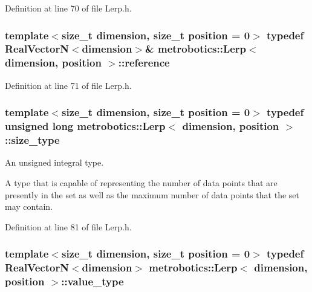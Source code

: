 \-Definition at line 70 of file \-Lerp.\-h.

\hypertarget{classmetrobotics_1_1Lerp_ae64c70e9dc4c0c99af76b155f6786ec0}{
\subsubsection[{reference}]{\setlength{\rightskip}{0pt plus 5cm}template$<$size\-\_\-t dimension, size\-\_\-t position = 0$>$ typedef {\bf \-Real\-Vector\-N}$<$dimension$>$\& {\bf metrobotics\-::\-Lerp}$<$ dimension, position $>$\-::{\bf reference}}}\label{classmetrobotics_1_1Lerp_ae64c70e9dc4c0c99af76b155f6786ec0}


\-Definition at line 71 of file \-Lerp.\-h.

\hypertarget{classmetrobotics_1_1Lerp_a10263c93dd1cabed5b5c06585f13c272}{
\subsubsection[{size\-\_\-type}]{\setlength{\rightskip}{0pt plus 5cm}template$<$size\-\_\-t dimension, size\-\_\-t position = 0$>$ typedef unsigned long {\bf metrobotics\-::\-Lerp}$<$ dimension, position $>$\-::{\bf size\-\_\-type}}}\label{classmetrobotics_1_1Lerp_a10263c93dd1cabed5b5c06585f13c272}


\-An unsigned integral type. 

\-A type that is capable of representing the number of data points that are presently in the set as well as the maximum number of data points that the set may contain. 

\-Definition at line 81 of file \-Lerp.\-h.

\hypertarget{classmetrobotics_1_1Lerp_ab1be5a6a96856f10c5eadc416d630a40}{
\subsubsection[{value\-\_\-type}]{\setlength{\rightskip}{0pt plus 5cm}template$<$size\-\_\-t dimension, size\-\_\-t position = 0$>$ typedef {\bf \-Real\-Vector\-N}$<$dimension$>$ {\bf metrobotics\-::\-Lerp}$<$ dimension, position $>$\-::{\bf value\-\_\-type}}}\label{classmetrobotics_1_1Lerp_ab1be5a6a96856f10c5eadc416d630a40}



